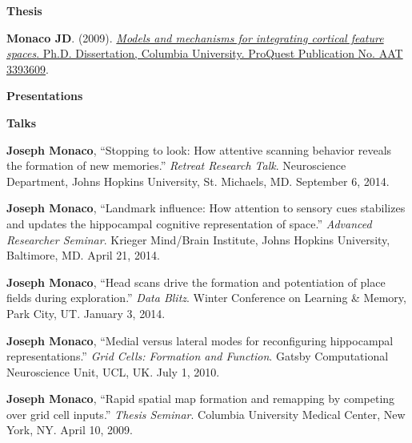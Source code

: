 \documentclass[10pt]{article}
\begin{document}
\pagebreak
{}
{\large \textbf{Thesis}}

\begin{description}
\item \textbf{Monaco JD}. (2009). \href{http://search.proquest.com/docview/304862872/abstract}{\emph{Models and mechanisms for integrating cortical feature spaces}. Ph.D. Dissertation, Columbia University. ProQuest Publication No. AAT 3393609}.
\end{description}

{\large \textbf{Presentations}}

\begin{description}
\item \textbf{Talks}
\item[\quad] \textbf{Joseph Monaco}, ``Stopping to look: How attentive scanning behavior reveals the formation of new memories.'' \emph{Retreat Research Talk}. Neuroscience Department, Johns Hopkins University, St. Michaels, MD. September 6, 2014.
\item[\quad] \textbf{Joseph Monaco}, ``Landmark influence: How attention to sensory cues stabilizes and updates the hippocampal cognitive representation of space.'' \emph{Advanced Researcher Seminar}. Krieger Mind/Brain Institute, Johns Hopkins University, Baltimore, MD. April 21, 2014.
\item[\quad] \textbf{Joseph Monaco}, ``Head scans drive the formation and potentiation of place fields during exploration.'' \emph{Data Blitz}. Winter Conference on Learning \& Memory, Park City, UT. January 3, 2014.
\item[\quad] \textbf{Joseph Monaco}, ``Medial versus lateral modes for reconfiguring hippocampal representations.'' \emph{Grid Cells: Formation and Function}. Gatsby Computational Neuroscience Unit, UCL, UK. July 1, 2010.
\item[\quad] \textbf{Joseph Monaco}, ``Rapid spatial map formation and remapping by competing over grid cell inputs.'' \emph{Thesis Seminar}. Columbia University Medical Center, New York, NY. April 10, 2009.
\end{description}
\end{document}
